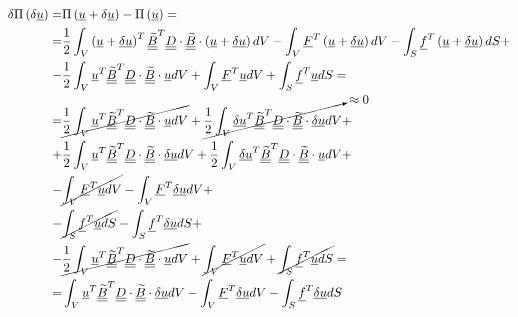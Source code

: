 \documentclass[a4paper]{jpconf}
\begin{document}
\begin{equation}
\begin{split}
\delta\Pi\left(\delta\underline{u}\right)=&\Pi\left(\underline{u}+\delta\underline{u}\right)-\Pi\left(\underline{u}\right)=\\=&\frac{1}{2}\int_{V}\left(\underline{u}+\underline{\delta u}\right)^{T}\underline{\underline{\widetilde{B}}}^{T}\underline{\underline{D}}\cdot\underline{\underline{\widetilde{B}}}\cdot\left(\underline{u}+\underline{\delta u}\right)dV-\int_{V}\underline{F}^{T}\left(\underline{u}+\underline{\delta u}\right)dV-\int_{S}\underline{f}^{T}\left(\underline{u}+\underline{\delta u}\right)dS+\\
-&\frac{1}{2}\int_{V}\underline{u}^{T}\underline{\underline{\widetilde{B}}}^{T}\underline{\underline{D}}\cdot\underline{\underline{\widetilde{B}}}\cdot\underline{u}dV+\int_{V}\underline{F}^{T}\underline{u}dV+\int_{S}\underline{f}^{T}\underline{u}dS=\\
=&\cancel{\frac{1}{2}\int_{V}\underline{u}^{T}\underline{\underline{\widetilde{B}}}^{T}\underline{\underline{D}}\cdot\underline{\underline{\widetilde{B}}}\cdot\underline{u}dV}+\cancelto{\approx 0}{\frac{1}{2}\int_{V}\underline{\delta u}^{T}\underline{\underline{\widetilde{B}}}^{T}\underline{\underline{D}}\cdot\underline{\underline{\widetilde{B}}}\cdot\underline{\delta u}dV}+\\
+&\frac{1}{2}\int_{V}\underline{u}^{T}\underline{\underline{\widetilde{B}}}^{T}\underline{\underline{D}}\cdot\underline{\underline{\widetilde{B}}}\cdot\underline{\delta u}dV+\frac{1}{2}\int_{V}\underline{\delta u}^{T}\underline{\underline{\widetilde{B}}}^{T}\underline{\underline{D}}\cdot\underline{\underline{\widetilde{B}}}\cdot\underline{u}dV+\\
-&\cancel{\int_{V}\underline{F}^{T}\underline{u}dV}-\int_{V}\underline{F}^{T}\underline{\delta u}dV+\\
-&\cancel{\int_{S}\underline{f}^{T}\underline{u}dS}-\int_{S}\underline{f}^{T}\underline{\delta u}dS+\\
-&\cancel{\frac{1}{2}\int_{V}\underline{u}^{T}\underline{\underline{\widetilde{B}}}^{T}\underline{\underline{D}}\cdot\underline{\underline{\widetilde{B}}}\cdot\underline{u}dV}+\cancel{\int_{V}\underline{F}^{T}\underline{u}dV}+\cancel{\int_{S}\underline{f}^{T}\underline{u}dS}=\\
=&\int_{V}\underline{u}^{T}\underline{\underline{\widetilde{B}}}^{T}\underline{\underline{D}}\cdot\underline{\underline{\widetilde{B}}}\cdot\underline{\delta u}dV-\int_{V}\underline{F}^{T}\underline{\delta u}dV-\int_{S}\underline{f}^{T}\underline{\delta u}dS
\end{split}
\end{equation}
\end{document}
